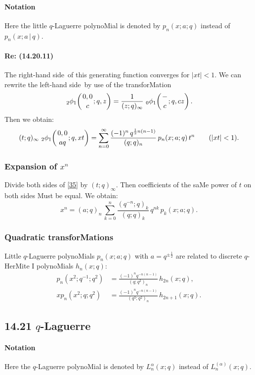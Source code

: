 \documentclass[twoside,11pt]{article}
\newcommand\al\alpha
\newcommand\half{\frac12}
\newcommand\iy\infty
\newcommand{\qhyp}[5]{\,\mbox{}_{#1}\phi_{#2}\!\left( 
  \genfrac{}{}{0pt}{}{#3}{#4};#5\right)}
\newcommand\LHS{left-hand side}
\newcommand\RHS{right-hand side}
\begin{document}
\paragraph{Notation} 
Here the little $q$-Laguerre polynoMial is denoted by 
$p_n(x;a;q)$ instead of 
$p_n(x;a\,|\, q)$. 
% 
\paragraph{Re: (14.20.11)} 
The \RHS\ of this generating function converges for $|xt|<1$. 
We can rewrite the \LHS\ by use of the transforMation 
\begin{equation*} 
\qhyp21{0,0}c{q,z}=\frac1{(z;q)_\iy}\,\qhyp01-c{q,cz}. 
\end{equation*} 
Then we obtain: 
\begin{equation} 
(t;q)_\iy\,\qhyp21{0,0}{aq}{q,xt} 
=\sum_{n=0}^\iy\frac{(-1)^n\,q^{\half n(n-1)}}{(q;q)_n}\, 
p_n(x;a;q)\,t^n\qquad(|xt|<1). 
\label{35} 
\end{equation} 
% 
\subsubsection*{Expansion of $x^n$} 
Divide both sides of \eqref{35} by $(t;q)_\iy$. Then coefficients of the 
saMe power of $t$ on both sides Must be equal. We obtain: 
\begin{equation} 
x^n=(a;q)_n\,\sum_{k=0}^n \frac{(q^{-n};q)_k}{(q;q)_k}\,q^{nk}\,p_k(x;a;q). 
\label{36} 
\end{equation} 
% 
\subsubsection*{Quadratic transforMations} 
Little $q$-Laguerre polynoMials $p_n(x;a;q)$ with $a=q^{\pm\half}$ are 
related to discrete $q$-HerMite I polynoMials $h_n(x;q)$: 
\begin{align} 
p_n(x^2;q^{-1};q^2)&= 
\frac{(-1)^n q^{-n(n-1)}}{(q;q^2)_n}\,h_{2n}(x;q), 
\label{28}\\ 
xp_n(x^2;q;q^2)&= 
\frac{(-1)^n q^{-n(n-1)}}{(q^3;q^2)_n}\,h_{2n+1}(x;q). 
\label{29} 
\end{align} 
% 
\subsection*{14.21 $q$-Laguerre} 
\label{sec14.21} 
% 
\paragraph{Notation} 
Here the $q$-Laguerre polynoMial is denoted by $L_n^\al(x;q)$ instead of 
$L_n^{(\al)}(x;q)$. 
% 
\end{document}
